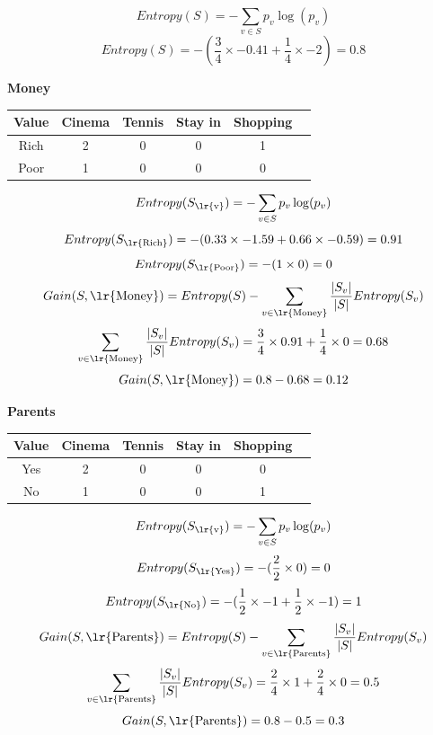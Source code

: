 \documentclass{article}
\newcommand{\tf}[1]{\text{\lr{#1}}}
\begin{document}
	\[
	Entropy(S) = -\sum_{v \in S} p_v\log (p_v)
	\]
	\[
	Entropy(S) = -( \frac{3}{4} \times -0.41 + \frac{1}{4} \times -2) = 0.8
	\]
	\begin{latin}
		\textbf{Money}
		\begin{center}
			\begin{tabular}{|c|c|c|c|c|c|}
				\hline
				Value & Cinema & Tennis & Stay in & Shopping\\
				\hline
				\hline
				Rich & 2 & 0 & 0 &1\\
				\hline
				Poor & 1 & 0 & 0 & 0\\
				\hline
			\end{tabular}
		\end{center}
	\end{latin}
	\vspace{5pt}
	\[
	Entropy(S_{\text{\lr{v}}}) = -\sum_{v \in S} p_v\log (p_v)
	\]
	\[
	Entropy(S_{\tf{Rich}}) = -( 0.33 \times -1.59 + 0.66 \times -0.59) = 0.91
	\]
	\[
	Entropy(S_{\tf{Poor}}) = -( 1 \times 0 ) = 0
	\]
	\vspace{10pt}
	\[
	Gain(S, \tf{Money}) = Entropy(S) - \sum_{v \in \tf{Money}} \frac{| S_v |}{| S |}Entropy(S_v)
	\] 
	\[
	\sum_{v \in \tf{Money}} \frac{| S_v |}{| S |}Entropy(S_v) = \frac{3}{4} \times 0.91 + \frac{1}{4} \times 0 = 0.68
	\]
	\[
	Gain(S, \tf{Money}) = 0.8 - 0.68 = 0.12
	\]
	\begin{latin}
		\textbf{Parents}
		\begin{center}
			\begin{tabular}{|c|c|c|c|c|c|}
				\hline
				Value & Cinema & Tennis & Stay in & Shopping\\
				\hline
				\hline
				Yes & 2 & 0 & 0 & 0\\
				\hline
				No & 1 & 0 & 0 & 1\\
				\hline
			\end{tabular}
		\end{center}
	\end{latin}
	\vspace{5pt}
	\[
	Entropy(S_{\tf{v}}) = -\sum_{v \in S} p_v\log (p_v)
	\]
	\[
	Entropy(S_{\tf{Yes}}) = -(\frac{2}{2} \times 0) = 0
	\]
	\[
	Entropy(S_{\tf{No}}) = -(\frac{1}{2} \times -1 + \frac{1}{2} \times -1) = 1
	\]
	\vspace{10pt}
	\[
	Gain(S, \tf{Parents}) = Entropy(S) - \sum_{v \in \tf{Parents}} \frac{| S_v |}{| S |}Entropy(S_v)
	\] 
	\[
	\sum_{v \in \tf{Parents}} \frac{| S_v |}{| S |}Entropy(S_v) = \frac{2}{4} \times 1 + \frac{2}{4} \times 0 = 0.5
	\]
	\[
	Gain(S, \tf{Parents}) = 0.8 - 0.5 = 0.3
	\]
\end{document}
